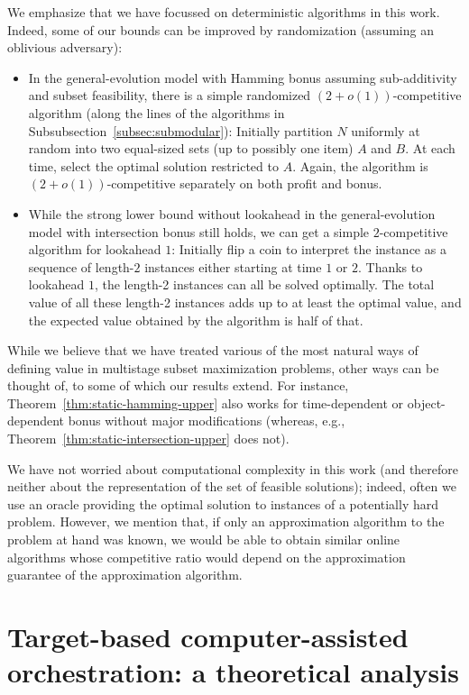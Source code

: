 \documentclass[a4paper]{book}
\newcommand{\finalversion}[1]{#1}
\begin{document}
We emphasize that we have focussed on deterministic algorithms in this work. Indeed, some of our bounds can be improved by randomization (assuming an oblivious adversary):
\begin{itemize}
    \item In the general-evolution model with Hamming bonus assuming \finalversion{sub-additivity} and subset feasibility, there is a simple randomized $(2+o(1))$-competitive algorithm (along the lines of the algorithms in Subsubsection~\ref{subsec:submodular}): Initially partition $N$ uniformly at random into two equal-sized sets (up to possibly one item) $A$ and $B$. At each time, select the optimal solution restricted to $A$. Again, the algorithm is $(2+o(1))$-competitive separately on both profit and bonus.
    \item While the strong lower bound without lookahead in the general-evolution model with intersection bonus still holds, we can get a simple $2$-competitive algorithm for lookahead $1$: Initially flip a coin to interpret the instance as a sequence of length-$2$ instances either starting at time $1$ or $2$. Thanks to lookahead $1$, the length-2 instances can all be solved optimally. The total value of all these length-2 instances adds up to at least the optimal value, and the expected value obtained by the algorithm is half of that.
\end{itemize}

While we believe that we have treated various of the most natural ways of defining value in multistage subset maximization problems, other ways can be thought of, to some of which our results extend. For instance, Theorem~\ref{thm:static-hamming-upper} also works for time-dependent or object-dependent bonus without major modifications (whereas, e.g., Theorem~\ref{thm:static-intersection-upper} does not).

We have not worried about computational complexity in this work (and therefore neither about the representation of the set of feasible solutions); indeed, often we use an oracle providing the optimal solution to instances of a potentially hard problem. However, we mention that, if only an approximation algorithm to the problem at hand was known, we would be able to obtain similar online algorithms whose competitive ratio would depend on the approximation guarantee of the approximation algorithm.

\chapter{Target-based computer-assisted orchestration: a theoretical analysis}
\end{document}

